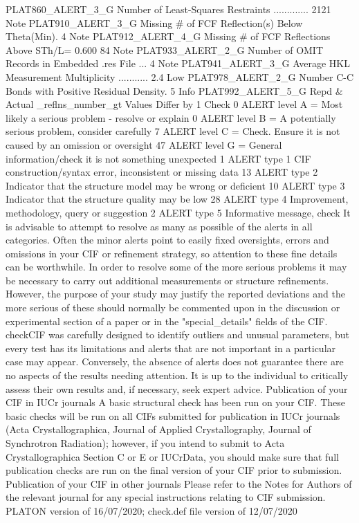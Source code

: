  
PLAT860_ALERT_3_G Number of Least-Squares Restraints .............       2121 Note  
PLAT910_ALERT_3_G Missing # of FCF Reflection(s) Below Theta(Min).          4 Note  
PLAT912_ALERT_4_G Missing # of FCF Reflections Above STh/L=  0.600         84 Note  
PLAT933_ALERT_2_G Number of OMIT Records in Embedded .res File ...          4 Note  
PLAT941_ALERT_3_G Average HKL Measurement Multiplicity ...........        2.4 Low   
PLAT978_ALERT_2_G Number C-C Bonds with Positive Residual Density.          5 Info  
PLAT992_ALERT_5_G Repd & Actual _reflns_number_gt Values Differ by          1 Check 
   0 ALERT level A = Most likely a serious problem - resolve or explain
   0 ALERT level B = A potentially serious problem, consider carefully
   7 ALERT level C = Check. Ensure it is not caused by an omission or oversight
  47 ALERT level G = General information/check it is not something unexpected
   1 ALERT type 1 CIF construction/syntax error, inconsistent or missing data
  13 ALERT type 2 Indicator that the structure model may be wrong or deficient
  10 ALERT type 3 Indicator that the structure quality may be low
  28 ALERT type 4 Improvement, methodology, query or suggestion
   2 ALERT type 5 Informative message, check
It is advisable to attempt to resolve as many as possible of the alerts in all categories. Often the
minor alerts point to easily fixed oversights, errors and omissions in your CIF or refinement
strategy, so attention to these fine details can be worthwhile. In order to resolve some of the more
serious problems it may be necessary to carry out additional measurements or structure
refinements. However, the purpose of your study may justify the reported deviations and the more
serious of these should normally be commented upon in the discussion or experimental section of a
paper or in the "special_details" fields of the CIF. checkCIF was carefully designed to identify
outliers and unusual parameters, but every test has its limitations and alerts that are not important
in a particular case may appear. Conversely, the absence of alerts does not guarantee there are no
aspects of the results needing attention. It is up to the individual to critically assess their own
results and, if necessary, seek expert advice.
Publication of your CIF in IUCr journals 
A basic structural check has been run on your CIF. These basic checks will be run on all CIFs
submitted for publication in IUCr journals (Acta Crystallographica, Journal of Applied 
Crystallography, Journal of Synchrotron Radiation); however, if you intend to submit to Acta
Crystallographica Section C or E or IUCrData, you should make sure that full publication checks
are run on the final version of your CIF prior to submission.
Publication of your CIF in other journals 
Please refer to the Notes for Authors of the relevant journal for any special instructions relating to
CIF submission.
PLATON version of 16/07/2020; check.def file version of 12/07/2020